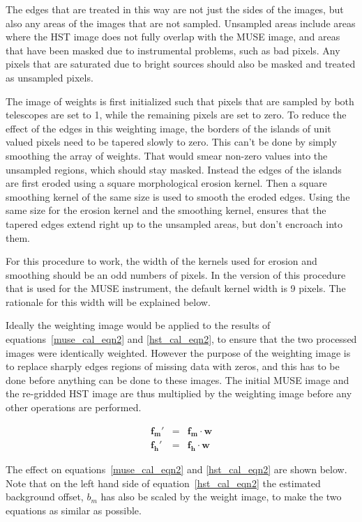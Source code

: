\documentclass[12pt,twoside,a4paper]{article}
\newcommand{\mimg}{\mathbf{f_m}}
\newcommand{\himg}{\mathbf{f_h}}
\newcommand{\wt}{\bm{w}}
\newcommand{\mbg}{b_m}
\begin{document}
The edges that are treated in this way are not just the sides of the
images, but also any areas of the images that are not
sampled. Unsampled areas include areas where the HST image does not
fully overlap with the MUSE image, and areas that have been masked due
to instrumental problems, such as bad pixels. Any pixels that are
saturated due to bright sources should also be masked and treated as
unsampled pixels.

The image of weights is first initialized such that pixels that are
sampled by both telescopes are set to 1, while the remaining pixels
are set to zero. To reduce the effect of the edges in this weighting
image, the borders of the islands of unit valued pixels need to be
tapered slowly to zero. This can't be done by simply smoothing the
array of weights. That would smear non-zero values into the unsampled
regions, which should stay masked. Instead the edges of the islands
are first eroded using a square morphological erosion kernel. Then a
square smoothing kernel of the same size is used to smooth the eroded
edges. Using the same size for the erosion kernel and the smoothing
kernel, ensures that the tapered edges extend right up to the
unsampled areas, but don't encroach into them.

For this procedure to work, the width of the kernels used for erosion
and smoothing should be an odd numbers of pixels. In the version of
this procedure that is used for the MUSE instrument, the default
kernel width is 9 pixels. The rationale for this width will be
explained below.

Ideally the weighting image would be applied to the results of
equations~\ref{muse_cal_eqn2} and \ref{hst_cal_eqn2}, to ensure that
the two processed images were identically weighted. However the
purpose of the weighting image is to replace sharply edges regions of
missing data with zeros, and this has to be done before anything can
be done to these images. The initial MUSE image and the re-gridded HST
image are thus multiplied by the weighting image before any other
operations are performed.

\begin{eqnarray}
  \mimg' &=& \mimg \cdot \wt \\
  \himg' &=& \himg \cdot \wt
\end{eqnarray}

The effect on equations~\ref{muse_cal_eqn2} and \ref{hst_cal_eqn2} are
shown below. Note that on the left hand side of
equation~\ref{hst_cal_eqn2} the estimated background offset, $\mbg$
has also be scaled by the weight image, to make the two equations as
similar as possible.
\end{document}
